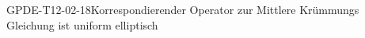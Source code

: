 
\begin{EXA}{GPDE-T12-02-18}{Korrespondierender Operator zur Mittlere Krümmungs Gleichung ist uniform elliptisch}
\end{EXA}
